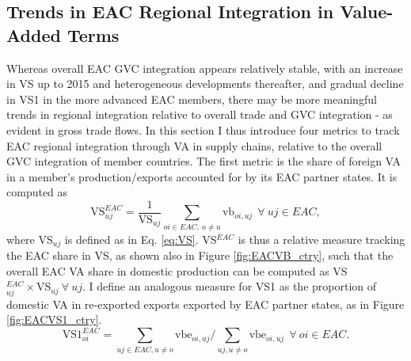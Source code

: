 \documentclass[a4paper]{article}
\begin{document}




\subsection{Trends in EAC Regional Integration in Value-Added Terms}

Whereas overall EAC GVC integration appears relatively stable, with an increase in VS up to 2015 and heterogeneous developments thereafter, and gradual decline in VS1 in the more advanced EAC members, there may be more meaningful trends in regional integration relative to overall trade and GVC integration - as evident in gross trade flows. In this section I %
thus introduce four metrics to track EAC regional integration through VA in supply chains, relative to the overall GVC integration of member countries. The first metric is the share of foreign VA in a member's production/exports accounted for by its EAC partner states. It is computed as 
%
\begin{equation} \label{eq:VS_EAC}
\text{VS}_{uj}^{EAC} = \frac{1}{\text{VS}_{uj}}  \sum_{oi \in EAC,\ o \neq  u} \text{vb}_{oi, uj}   \ \ \forall\ uj \in EAC,
\end{equation} 
%
\noindent where VS$_{uj}$ is defined as in Eq. \ref{eq:VS}. VS$^{EAC}$ is thus a relative measure tracking the EAC share in VS, as shown also in Figure \ref{fig:EACVB_ctry}, such that the overall EAC VA share in domestic production can be computed as VS$_{uj}^{EAC} \times \text{VS}_{uj} \ \forall\ uj$. I define an analogous measure for VS1 as the proportion of domestic VA in re-exported exports exported by EAC partner states, as in Figure \ref{fig:EACVS1_ctry}. 
%
\begin{equation} \label{eq:VS1_EAC}
\text{VS1}_{oi}^{EAC} =  \sum_{uj \in EAC, u \neq  o} \text{vbe}_{oi, uj} \bigg/ \sum_{uj, u \neq  o} \text{vbe}_{oi, uj}\ \ \forall\ oi \in EAC.
\end{equation}
\end{document}
